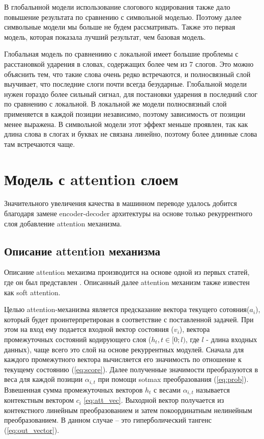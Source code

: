 \documentclass[14pt, a4paper, russian]{extreport}
\begin{document}
В глобальнной модели использование слогового кодирования также дало повышение результата по сравнению с символьной моделью. Поэтому далее символьные модели мы больше не будем рассматривать.  Также это первая модель, которая показала лучший результат, чем базовая модель. 

Глобальная модель  по сравнениию с локальной имеет большие проблемы с расстановкой ударения в словах, содержащих более чем из 7 слогов. Это можно объяснить тем, что такие слова очень редко встречаются, и полносвязный слой выучивает, что последние слоги почти всегда безударные. Глобальной модели нужен гораздо более сильный сигнал, для постановки ударения в последний слог по сравнению с локальной. В локальной же модели полносвязный слой применяется в каждой позиции независимо, поэтому зависимость от позиции менее выражена. В символьной модели этот эффект меньше проявлен, так как длина слова в слогах и буквах не связана линейно, поэтому более длинные слова там встречаются чаще. 

\section{Модель с attention слоем}
Значительного увеличения качества в машинном переводе удалось добится благодаря замене encoder-decoder архитектуры на основе только рекуррентного слоя добавление attention механизма. 
\subsection{Описание attention механизма}
Описание attention мехаизма производится на основе одной из первых статей, где он был представлен \cite{bahdanau}. Описанный далее attention механизм также известен как soft attention.

Целью attention-механизма является предсказание вектора текущего сотояния($a_i$), который будет проинтерпретирован в соответствие с поставленной задачей. При этом на вход ему подается входной вектор состояния ($v_i$), вектора промежуточных состояний кодирующего слоя ($h_t, t \in [0; l)$, где $l$ - длина входных данных), чаще всего это слой на основе рекуррентных модулей. 
Сначала для каждого промежутного вектора вычисляется его значимость по отношение к текущему состоянию (\ref{eq:score}). Далее полученные значимости преобразуются в веса для каждой позиции  $\alpha_{i,t}$ при помощи sotmax преобразования (\ref{eq:prob}). Взвешенная сумма промежуточных векторов $h_t$ с весами $\alpha_{i,t}$ называется контекстным вектором $c_i$ \ref{eq:att_vec}. Выходной вектор получается из контекстного линейным преобразованием и затем покоординатным нелинейным преобразованием. В данном случае -- это гиперболический тангенс (\ref{eq:out_vector}).
\end{document}
